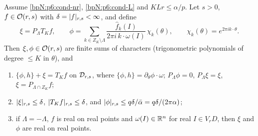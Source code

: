 \begin{proposition}\label{bpN:p6:homological}
Assume \ref{bpN:p6:cond-nr}, \ref{bpN:p6:cond-L} and $KLr\le\alpha/p$. Let $s>0$, $f\in\mathcal O(r,s)$ with $\delta=\lvert f\rvert_{r,s}<\infty$, and define
\[\xi=P_\Lambda T_Kf,\qquad\phi=\sum_{k\in Z_K\setminus\Lambda}\frac{\hat f_k(I)}{2\pi i\,k\cdot\omega(I)}\,\chi_k(\theta),\qquad\chi_k(\theta)=e^{2\pi ik\cdot\theta}.\]
Then $\xi,\phi\in\mathcal O(r,s)$ are finite sums of characters (trigonometric polynomials of degree $\le K$ in $\theta$), and
\begin{enumerate}[label=(\alph*)]
\item $\{\phi,h\}+\xi=T_Kf$ on $\mathcal D_{r,s}$, where $\{\phi,h\}=\partial_\theta\phi\cdot\omega$; $P_\Lambda\phi=0$, $P_\Lambda\xi=\xi$, $\xi=P_{\Lambda\cap Z_K}f$;
\item $\lvert \xi\rvert_{r,s}\le\delta$, $\lvert T_Kf\rvert_{r,s}\le\delta$, and $\lvert \phi\rvert_{r,s}\le q\delta/\bar\alpha=q\delta/(2\pi\alpha)$;
\item if $\Lambda=-\Lambda$, $f$ is real on real points and $\omega(I)\in\mathbb{R}^n$ for real $I\in V_rD$, then $\xi$ and $\phi$ are real on real points.
\end{enumerate}
\end{proposition}
